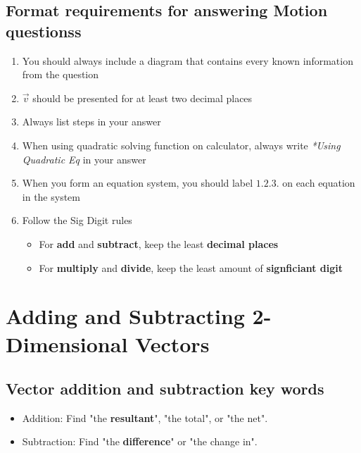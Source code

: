 \subsection{Format requirements for answering Motion questionss}
\begin{enumerate}
    \item You should always include a diagram that contains every known information from the question
    \item $\vec{v}$ should be presented for at least two decimal places
    \item Always list steps in your answer
    \item When using quadratic solving function on calculator, always write \textit{*Using Quadratic Eq} in your answer
    \item When you form an equation system, you should label $1. 2. 3.$ on each equation in the system
    \item Follow the Sig Digit rules
    \begin{itemize}
        \item[!] For \textbf{add} and \textbf{subtract}, keep the least \textbf{decimal places}
        \item[!] For \textbf{multiply} and \textbf{divide}, keep the least amount of \textbf{signficiant digit} 
    \end{itemize}
\end{enumerate}

\newpage
\section{Adding and Subtracting 2-Dimensional Vectors}
\subsection{Vector addition and subtraction key words}
\begin{itemize}
    \item[+] Addition: Find "the \textbf{resultant}", "the total", or "the net". 
    \item[-] Subtraction: Find "the \textbf{difference}" or "the change in".
\end{itemize}

